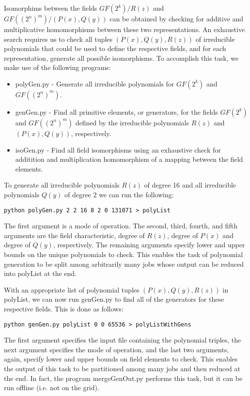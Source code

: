 \documentclass[11pt]{article}
\begin{document}
Isomorphims between the fields $GF(2^k)/R(z)$ and $GF((2^n)^m)/(P(x),Q(y))$
can be obtained by checking for additive and multiplicative
homomorphisms between these two representations. An exhaustive search requires
us to check all tuples $(P(x), Q(y), R(z))$ of irreducible polynomials that 
could be used to define the respective fields, and for each representation,
generate all possible isomorphisms. To accomplish this task, we make use
of the following programs:
\begin{itemize}
	\item polyGen.py - Generate all irreducible polynomials for $GF(2^k)$ and $GF((2^n)^m)$.
	\item genGen.py - Find all primitive elements, or generators, for the fields $GF(2^k)$
	and $GF((2^n)^m)$ defined by the irreducible polynomials $R(z)$ and $(P(x),Q(y))$, respectively.
	\item isoGen.py - Find all field isomorphisms using an exhaustive check for additition
	and multiplication homomorphism of a mapping between the field elements.
\end{itemize}

To generate all irreducible polynomials $R(z)$ of degree 16 and all
irreducible polynomials $Q(y)$ of degree 2 we can run the following:
\begin{center}
{\tt python polyGen.py 2 2 16 8 2 0 131071 > polyList}
\end{center}
The first argument is a mode of operation. The second, third, fourth, and fifth
arguments are the field characteristic, degree of $R(z)$, degree of $P(x)$
and degree of $Q(y)$, respectively. The remaining arguments specify lower
and upper bounds on the unique polynomials to check. This enables the task
of polynomial generation to be split among arbitrarily many jobs whose output
can be reduced into polyList at the end.

With an appropriate list of polynomial tuples $(P(x), Q(y), R(z))$ in polyList, 
we can now run genGen.py to find all of the generators for these respective fields.
This is done as follows:
\begin{center}
{\tt python genGen.py polyList 0 0 65536 > polyListWithGens}
\end{center}
The first argument specifies the input file containing the polynomial triples, the next
argument specifies the mode of operation, and the last two arguments, again, specify
lower and upper bounds on field elements to check. This enables the output of this task
to be partitioned among many jobs and then reduced at the end. In fact, the program
mergeGenOut.py performs this task, but it can be run offline (i.e. not on the grid).
\end{document}
